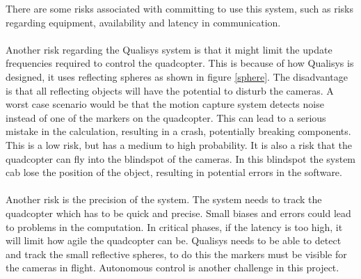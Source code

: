 There are some risks associated with committing to use this system, such as risks regarding equipment, availability and latency in communication.
\\\\
Another risk regarding the Qualisys system is that it might limit the update frequencies required to control the quadcopter. This is because of how Qualisys is designed, it uses reflecting spheres as shown in figure \ref{sphere}.
The disadvantage is that all reflecting objects will have the potential to disturb the cameras. A worst case scenario would be that the motion capture system detects noise instead of one of the markers on the quadcopter. This can lead to a serious mistake in the calculation, resulting in a crash, potentially breaking components. This is a low risk, but has a medium to high probability. It is also a risk that the quadcopter can fly into the blindspot of the cameras. In this blindspot the system cab lose the position of the object, resulting in potential errors in the software. 
\\\\
Another risk is the precision of the system. The system needs to track the quadcopter which has to be quick and precise. Small biases and errors could lead to problems in the computation. In critical phases, if the latency is too high, it will limit how agile the quadcopter can be. Qualisys needs to be able to detect and track the small reflective spheres, to do this the markers must be visible for the cameras in flight. Autonomous control is another challenge in this project.  
